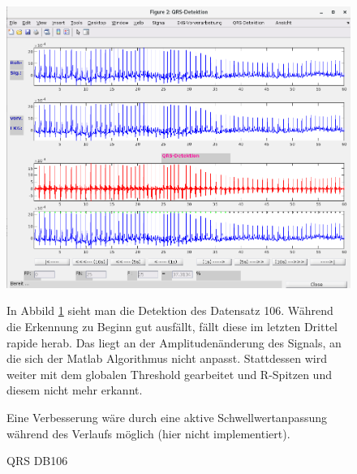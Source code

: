 \documentclass[a4paper,12pt,titlepage]{scrartcl}
\begin{document}
\begin{figure}[ht]
    \begin{minipage}[t]{0.5\linewidth}
        \centering
        \includegraphics[width=0.9\linewidth, valign=t]{Assets/LaborBMT-16-33-27.png}
        \caption{QRS DB106}
        \label{qrsdb106}
    \end{minipage}%
    \begin{minipage}[t]{0.5\linewidth}
        In Abbild \ref{qrsdb106} sieht man die Detektion des Datensatz 106. Während die Erkennung zu Beginn gut ausfällt, fällt diese im letzten Drittel rapide herab. Das liegt an der Amplitudenänderung des Signals, an die sich der Matlab Algorithmus nicht anpasst. Stattdessen wird weiter mit dem globalen Threshold gearbeitet und R-Spitzen und diesem nicht mehr erkannt.

        Eine Verbesserung wäre durch eine aktive Schwellwertanpassung während des Verlaufs möglich (hier nicht implementiert).
    \end{minipage}
\end{figure}
\end{document}
